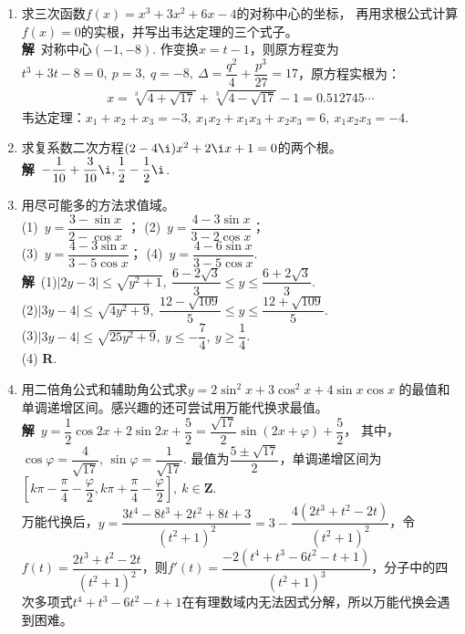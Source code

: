 \begin{enumerate}[label={\textbf{\arabic*.}},leftmargin=
    \inteval{\myenumleftmargin}pt]
\item 求三次函数$ f(x)=x^3+3x^2+6x-4 $的对称中心的坐标，
再用求根公式计算$ f(x)=0 $的实根，并写出韦达定理的三个式子。
\ifteach \\ \textbf{解}\ 
对称中心$ (-1,-8) $. 作变换$ x=t-1 $，则原方程变为$ t^3+3t-8=0,\ p=3,\ q=-8,\ 
\Delta=\dfrac{q^2}{4}+\dfrac{p^3}{27}=17 $，原方程实根为：
\begin{align*}
    x =\sqrt[3]{4+\sqrt{17}}+\sqrt[3]{4-\sqrt{17}}-1=0.512745\cdots
\end{align*}
韦达定理：$ x_1+x_2+x_3=-3,\ x_1x_2+x_1x_3+x_2x_3=6,\ x_1x_2x_3=-4 $. 
\fi

\item 求复系数二次方程$ (2-4\i)x^2+2\i x+1=0 $的两个根。
\ifteach \\ \textbf{解}\ 
$ -\dfrac{1}{10}+\dfrac{3}{10}\i,\dfrac{1}{2}-\dfrac{1}{2}\i $. 
\fi

\item 用尽可能多的方法求值域。\\
(1)\ $ y=\dfrac{3-\sin x}{2-\cos x} $ ；\quad 
(2)\ $ y=\dfrac{4-3\sin x}{3-2\cos x} $；\\
(3)\ $ y=\dfrac{4-3\sin x}{3-5\cos x} $；\quad
(4)\ $ y=\dfrac{4-6\sin x}{3-5\cos x} $.
\ifteach \\ \textbf{解}\ 
(1)$ |2y-3|\leq \sqrt{y^2+1},\ \dfrac{6-2\sqrt{3}}{3}\leq y\leq \dfrac{6+2\sqrt{3}}{3} $. \\
(2)$ |3y-4|\leq \sqrt{4y^2+9},\ \dfrac{12-\sqrt{109}}{5}\leq y\leq \dfrac{12+\sqrt{109}}{5} $. \\
(3)$ |3y-4|\leq \sqrt{25y^2+9},\ y\leq -\dfrac{7}{4},\ y\geq\dfrac{1}{4} $. \\
(4) \textbf{R}.
\fi

\item 用二倍角公式和辅助角公式求$ y=2\sin^2 x+3\cos^2 x+4\sin x\cos x $
的最值和单调递增区间。感兴趣的还可尝试用万能代换求最值。
\ifteach \\ \textbf{解}\ 
$ y=\dfrac{1}{2}\cos 2x+2\sin2x+\dfrac{5}{2}=
\dfrac{\sqrt{17}}{2}\sin(2x+\varphi)+\dfrac{5}{2} $，
其中，$ \cos\varphi=\dfrac{4}{\sqrt{17}} $, $ \sin\varphi=\dfrac{1}{\sqrt{17}} $. 
最值为$ \dfrac{5\pm \sqrt{17}}{2} $，单调递增区间为$ [k\pi-\dfrac{\pi}{4}-\dfrac{\varphi}{2},k\pi+\dfrac{\pi}{4}-\dfrac{\varphi}{2}],\ k\in \textbf{Z} $. \\
万能代换后，$ y=\dfrac{3t^4-8t^3+2t^2+8t+3}{(t^2+1)^2}=3-\dfrac{4(2t^3+t^2-2t)}
{(t^2+1)^2} $，令$ f(t)=\dfrac{2t^3+t^2-2t}{(t^2+1)^2} $，则$ f'(t)=
\dfrac{-2(t^4+t^3-6t^2-t+1)}{(t^2+1)^3} $，分子中的四次多项式$ t^4+t^3-6t^2-t+1 $在有理数域内无法因式分解，所以万能代换会遇到困难。
\fi


\end{enumerate}
